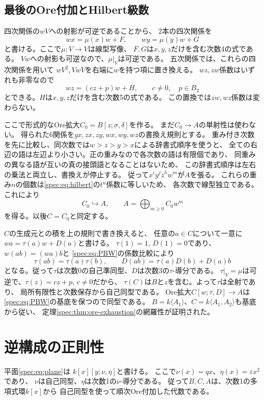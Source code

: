 \documentclass[11pt,a4paper]{ltjsarticle}
\theoremstyle{definition}
\begin{document}
\subsection{最後のOre付加とHilbert級数}
四次関係の$wV$への射影が可逆であることから、
2本の四次関係を
\[
wx=\mu(x)w+F,\qquad wy=\mu(y)w+G
\]
と書ける。ここで$\mu:V\to V$は線型写像、
$F,G$は$x,y,z$だけを含む次数4の式である。
$Vw$への射影も可逆なので、$\mu|_V$は可逆である。
五次関係では、これらの四次関係を用いて
$wV^2,VwV$を右端に$w$を持つ項に置き換える。
$wz,zw$係数はいずれも非零なので
\[
wz=(cz+p)w+H,\qquad c\ne0,\quad p\in B_2
\]
とできる。$H$は$x,y,z$だけを含む次数5の式である。
この置換では$zw,wz$係数は変わらない。

ここで形式的なOre拡大$C_0=B[z;\sigma,\delta]$を作る。
まだ$C_0\to A$の単射性は使わない。
得られた6関係を$yx,zx,zy,wx,wy,wz$の書換え規則とする。
重み付き次数を先に比較し、同次数では$w>z>y>x$による辞書式順序を使うと、
全ての右辺の語は左辺より小さい。正の重みなので各次数の語は有限個であり、
同重みの異なる語が互いの真の接頭語となることはないため、
この辞書式順序は左右の乗法と両立し、書換えが停止する。
従って$x^iy^jz^hw^m$が$A$を張る。
これらの重み$n$の個数は\eqref{spec:eq:hilbert}の$t^n$係数に等しいため、
各次数で線型独立である。これにより
\begin{equation}\label{spec:eq:PBW}
C_0\hookrightarrow A,\qquad A=\bigoplus_{m\geq0}C_0w^m
\end{equation}
を得る。以後$C=C_0$と同定する。

$C$の生成元との積を上の規則で書き換えると、
任意の$a\in C$について一意に
$wa=\tau(a)w+D(a)$と書ける。
$\tau(1)=1$, $D(1)=0$であり、$w(ab)=(wa)b$と
\eqref{spec:eq:PBW}の係数比較により
\[
\tau(ab)=\tau(a)\tau(b),\qquad
D(ab)=\tau(a)D(b)+D(a)b
\]
となる。従って$\tau$は次数0の自己準同型、$D$は次数3の$\tau$-導分である。
$\tau|_V=\mu$は可逆で、$\tau(z)=cz+p$, $c\ne0$だから、
$\tau(C)$は$B$と$z$を含む。よって$\tau$は全射であり、
局所有限性と次数保存から自己同型である。
Ore拡大$C[w;\tau,D]\to A$は\eqref{spec:eq:PBW}の基底を保つので同型である。
$B=k\langle A_1\rangle$、$C=k\langle A_1,A_2\rangle$も基底から従い、
定理\ref{spec:thm:ore-exhaustion}の網羅性が証明された。

\section{逆構成の正則性}\label{spec:sec:converse}
平面\eqref{spec:eq:plane}は
$k[x][y;\nu,\eta]$と書ける。
ここで$\nu(x)=qx$、$\eta(x)=\varepsilon x^2$であり、
$\nu$は自己同型、$\eta$は次数1の$\nu$-導分である。
従って$B,C,A$は、次数1の多項式環$k[x]$から
自己同型を使って順次Ore付加した代数である。
\end{document}
